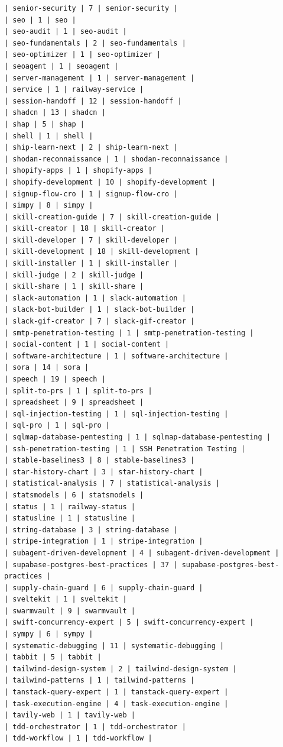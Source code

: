 \begin{Verbatim}[breaklines,breakanywhere,fontsize=\footnotesize]
| senior-security | 7 | senior-security |
| seo | 1 | seo |
| seo-audit | 1 | seo-audit |
| seo-fundamentals | 2 | seo-fundamentals |
| seo-optimizer | 1 | seo-optimizer |
| seoagent | 1 | seoagent |
| server-management | 1 | server-management |
| service | 1 | railway-service |
| session-handoff | 12 | session-handoff |
| shadcn | 13 | shadcn |
| shap | 5 | shap |
| shell | 1 | shell |
| ship-learn-next | 2 | ship-learn-next |
| shodan-reconnaissance | 1 | shodan-reconnaissance |
| shopify-apps | 1 | shopify-apps |
| shopify-development | 10 | shopify-development |
| signup-flow-cro | 1 | signup-flow-cro |
| simpy | 8 | simpy |
| skill-creation-guide | 7 | skill-creation-guide |
| skill-creator | 18 | skill-creator |
| skill-developer | 7 | skill-developer |
| skill-development | 18 | skill-development |
| skill-installer | 1 | skill-installer |
| skill-judge | 2 | skill-judge |
| skill-share | 1 | skill-share |
| slack-automation | 1 | slack-automation |
| slack-bot-builder | 1 | slack-bot-builder |
| slack-gif-creator | 7 | slack-gif-creator |
| smtp-penetration-testing | 1 | smtp-penetration-testing |
| social-content | 1 | social-content |
| software-architecture | 1 | software-architecture |
| sora | 14 | sora |
| speech | 19 | speech |
| split-to-prs | 1 | split-to-prs |
| spreadsheet | 9 | spreadsheet |
| sql-injection-testing | 1 | sql-injection-testing |
| sql-pro | 1 | sql-pro |
| sqlmap-database-pentesting | 1 | sqlmap-database-pentesting |
| ssh-penetration-testing | 1 | SSH Penetration Testing |
| stable-baselines3 | 8 | stable-baselines3 |
| star-history-chart | 3 | star-history-chart |
| statistical-analysis | 7 | statistical-analysis |
| statsmodels | 6 | statsmodels |
| status | 1 | railway-status |
| statusline | 1 | statusline |
| string-database | 3 | string-database |
| stripe-integration | 1 | stripe-integration |
| subagent-driven-development | 4 | subagent-driven-development |
| supabase-postgres-best-practices | 37 | supabase-postgres-best-practices |
| supply-chain-guard | 6 | supply-chain-guard |
| sveltekit | 1 | sveltekit |
| swarmvault | 9 | swarmvault |
| swift-concurrency-expert | 5 | swift-concurrency-expert |
| sympy | 6 | sympy |
| systematic-debugging | 11 | systematic-debugging |
| tabbit | 5 | tabbit |
| tailwind-design-system | 2 | tailwind-design-system |
| tailwind-patterns | 1 | tailwind-patterns |
| tanstack-query-expert | 1 | tanstack-query-expert |
| task-execution-engine | 4 | task-execution-engine |
| tavily-web | 1 | tavily-web |
| tdd-orchestrator | 1 | tdd-orchestrator |
| tdd-workflow | 1 | tdd-workflow |

\end{Verbatim}
